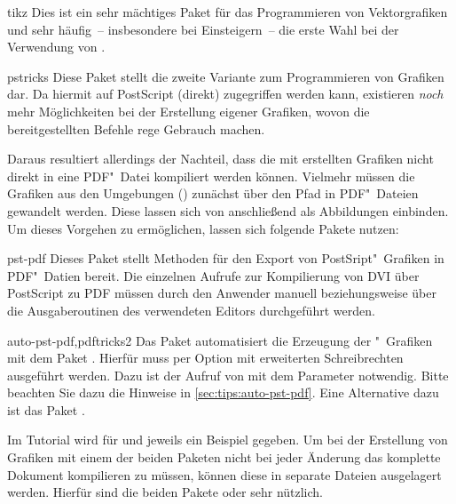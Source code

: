 \begin{packages}
\item[tikz]
  Dies ist ein sehr mächtiges Paket für das Programmieren von Vektorgrafiken 
  und sehr häufig~-- insbesondere bei Einsteigern~-- die erste Wahl bei der 
  Verwendung von .
\item[pstricks]
  Diese Paket stellt die zweite Variante zum Programmieren von Grafiken dar. 
  Da hiermit auf PostScript (direkt) zugegriffen werden kann, existieren 
  \emph{noch} mehr Möglichkeiten bei der Erstellung eigener Grafiken, wovon
  die bereitgestellten Befehle rege Gebrauch machen. 
  
  Daraus resultiert allerdings der Nachteil, dass die mit  
  erstellten Grafiken nicht direkt in eine PDF"~Datei kompiliert werden können. 
  Vielmehr müssen die Grafiken aus den Umgebungen 
  () zunächst über den Pfad 
   in PDF"~Dateien gewandelt werden. Diese 
  lassen sich von  anschließend als Abbildungen einbinden. Um 
  dieses Vorgehen zu ermöglichen, lassen sich folgende Pakete nutzen:
  \begin{packages}
  \item[pst-pdf]
    Dieses Paket stellt Methoden für den Export von PostSript"~Grafiken in 
    PDF"~Datien bereit. Die einzelnen Aufrufe zur Kompilierung von DVI über 
    PostScript zu PDF müssen durch den Anwender manuell beziehungsweise über 
    die Ausgaberoutinen des verwendeten Editors durchgeführt werden.
  \item[auto-pst-pdf,pdftricks2]
    Das Paket automatisiert die Erzeugung der "~Grafiken mit 
    dem Paket . Hierfür muss  per Option mit 
    erweiterten Schreibrechten ausgeführt werden. Dazu ist der Aufruf von 
     mit dem Parameter  notwendig. Bitte 
    beachten Sie dazu die Hinweise in \autoref{sec:tips:auto-pst-pdf}. Eine 
    Alternative dazu ist das Paket .
  \end{packages}
\end{packages}
%
Im Tutorial  wird für  und  
jeweils ein Beispiel gegeben. Um bei der Erstellung von Grafiken mit einem der 
beiden Paketen nicht bei jeder Änderung das komplette Dokument kompilieren zu 
müssen, können diese in separate Dateien ausgelagert werden. Hierfür sind die 
beiden Pakete  oder  sehr nützlich.

